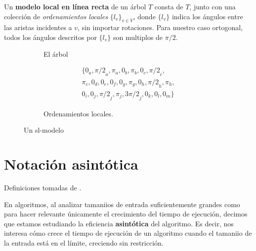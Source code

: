 \begin{definition}
Un \textbf{modelo local en l\'inea recta}\cite{paper} de un \'arbol $T$ consta de $T$, junto con una colecci\'on de \emph{ordenamientos locales} $\{l_v\}_{v\in V}$, donde $\{l_v\}$ indica los \'angulos entre las aristas incidentes a $v$, sin importar rotaciones. Para nuestro caso ortogonal, todos los \'angulos descritos por $\{l_v\}$ son multiplos de $\pi/2$.
\end{definition}

\begin{figure}
  \begin{subfigure}{0.4\textwidth}
    \caption{El \'arbol}
  \end{subfigure}
  \begin{subfigure}{0.4\textwidth}
    \begin{equation*}
      \begin{split}
        \{0_a, {\pi/2}_a, \pi_a, 0_b, \pi_b, 0_c, {\pi/2}_c, \\
        \pi_c, 0_d, 0_e,0_f, 0_g, \pi_g, 0_h, {\pi/2}_h,\pi_h, \\
        0_i, 0_j, {\pi/2}_j, \pi_j, {3\pi/2}_j, 0_k, 0_l, 0_m\}
      \end{split}
    \end{equation*}
    \caption{Ordenamientos locales.}
  \end{subfigure}
  \caption{Un sl-modelo}
\end{figure}

\section{Notaci\'on asint\'otica}

Definiciones tomadas de \cite{cormenetal}.

En algoritmos, al analizar tamaniios de entrada suficientemente grandes como para hacer relevante \'unicamente el crecimiento del tiempo de ejecuci\'on, decimos que estamos estudiando la eficiencia \textbf{asint\'otica} del algoritmo. Es decir, nos interesa c\'omo crece el tiempo de ejecuci\'on de un algoritmo cuando el tamaniio de la entrada est\'a en el l\'imite, creciendo sin restricci\'on.

